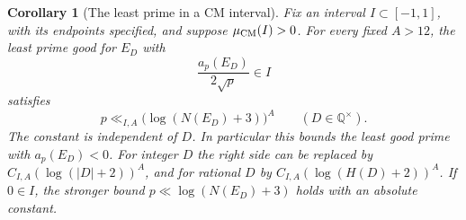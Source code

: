 \documentclass[11pt,a4paper]{article}
\numberwithin{equation}{section}
\newtheorem{corollary}[theorem]{Corollary}
\theoremstyle{definition}
\theoremstyle{remark}
\newcommand{\Q}{\mathbb Q}
\begin{document}
\begin{corollary}[The least prime in a CM interval]\label{cor:least}
Fix an interval $I\subset[-1,1]$, with its endpoints specified, and suppose $\mu_{\rm CM}(I)>0$. For every fixed $A>12$, the least prime good for $E_D$ with
\[
 \frac{a_p(E_D)}{2\sqrt p}\in I
\]
satisfies
\begin{equation}\label{eq:leastCM}
 p\ll_{I,A}\bigl(\log(N(E_D)+3)\bigr)^A
 \qquad(D\in\Q^\times).
\end{equation}
The constant is independent of $D$. In particular this bounds the least good prime with $a_p(E_D)<0$. For integer $D$ the right side can be replaced by $C_{I,A}(\log(|D|+2))^A$, and for rational $D$ by $C_{I,A}(\log(H(D)+2))^A$.
If $0\in I$, the stronger bound $p\ll\log(N(E_D)+3)$ holds with an absolute constant.
\end{corollary}
\end{document}
